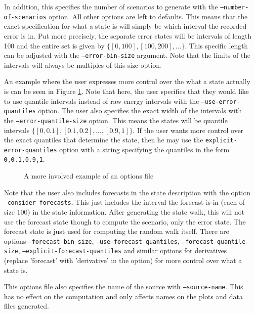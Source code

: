 \documentclass[11pt]{article}
\begin{document}
	In addition, this specifies the number of scenarios to generate with the 
	\texttt{--number-of-scenarios} option. All other options are left to
	defaults. This means that the exact specification for what a state is
	will simply be which interval the recorded error is in. Put more precisely,
	the separate error states will be intervals of length 100 and the entire
	set is given by $\{[0, 100], [100, 200], \ldots\}$. This specific length
	can be adjusted with the \texttt{--error-bin-size} argument. Note that the
	limits of the intervals will always be multiples of this size option.
	
	An example where the user expresses more control over the what a state
	actually is can be seen in Figure \ref{example2}. Note that here, the user
	specifies that they would like to use quantile intervals instead of raw
	energy intervals with the \texttt{--use-error-quantiles} option. The user
	also specifies the exact width of the intervals with the 
	\texttt{--error-quantile-size} option. This means the states will 
	be quantile intervals $\{[0,0.1],[0.1,0.2],\ldots,[0.9,1]\}$. If the user
	wants more control over the exact quantiles that determine the state, then
	he may use the \texttt{explicit-error-quantiles} option with a string
	specifying the quantiles in the form \texttt{0,0.1,0.9,1}.
	
	\begin{figure}[H]
	\begin{framed}
		
	\end{framed}
	\caption{A more involved example of an options file}
	\label{example2}
	\end{figure}
	
	Note that the user also includes forecasts in the state description with
	the option \texttt{--consider-forecasts}. This just includes the interval
	the forecast is in (each of size 100) in the state information. After
	generating the state walk, this will not use the forecast state though
	to compute the scenario, only the error state. The forecast state is just
	used for computing the random walk itself. There are options
	\texttt{--forecast-bin-size}, \texttt{--use-forecast-quantiles},
	\texttt{--forecast-quantile-size}, \texttt{--explicit-forecast-quantiles}
	and similar options for derivatives (replace 'forecast' with 'derivative' in the option) for more control over what a state is.
	
	This options file also specifies the name of the source with \texttt{--source-name}. This has no effect on the computation and only affects names on
	the plots and data files generated.
	
\end{document}
